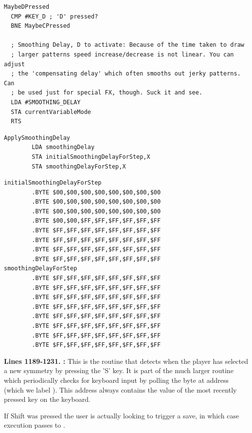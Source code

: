 \begin{lstlisting}[caption=From \icode{CheckKeyboardInput}.]
MaybeDPressed   
  CMP #KEY_D ; 'D' pressed?
  BNE MaybeCPressed

  ; Smoothing Delay, D to activate: Because of the time taken to draw
  ; larger patterns speed increase/decrease is not linear. You can adjust
  ; the 'compensating delay' which often smooths out jerky patterns. Can
  ; be used just for special FX, though. Suck it and see.
  LDA #SMOOTHING_DELAY
  STA currentVariableMode
  RTS 
\end{lstlisting}
\begin{lstlisting}[caption=From \icode{MainInterruptHandler}.]
ApplySmoothingDelay    
        LDA smoothingDelay
        STA initialSmoothingDelayForStep,X
        STA smoothingDelayForStep,X
\end{lstlisting}

\begin{lstlisting}[caption=Definition of \icode{smoothingDelayForStep} and its counterpart \icode{initialSmoothingDelayForStep}..]
initialSmoothingDelayForStep
        .BYTE $00,$00,$00,$00,$00,$00,$00,$00
        .BYTE $00,$00,$00,$00,$00,$00,$00,$00
        .BYTE $00,$00,$00,$00,$00,$00,$00,$00
        .BYTE $00,$00,$FF,$FF,$FF,$FF,$FF,$FF
        .BYTE $FF,$FF,$FF,$FF,$FF,$FF,$FF,$FF
        .BYTE $FF,$FF,$FF,$FF,$FF,$FF,$FF,$FF
        .BYTE $FF,$FF,$FF,$FF,$FF,$FF,$FF,$FF
        .BYTE $FF,$FF,$FF,$FF,$FF,$FF,$FF,$FF
smoothingDelayForStep
        .BYTE $FF,$FF,$FF,$FF,$FF,$FF,$FF,$FF
        .BYTE $FF,$FF,$FF,$FF,$FF,$FF,$FF,$FF
        .BYTE $FF,$FF,$FF,$FF,$FF,$FF,$FF,$FF
        .BYTE $FF,$FF,$FF,$FF,$FF,$FF,$FF,$FF
        .BYTE $FF,$FF,$FF,$FF,$FF,$FF,$FF,$FF
        .BYTE $FF,$FF,$FF,$FF,$FF,$FF,$FF,$FF
        .BYTE $FF,$FF,$FF,$FF,$FF,$FF,$FF,$FF
        .BYTE $FF,$FF,$FF,$FF,$FF,$FF,$FF,$FF
\end{lstlisting}
\clearpage
\textbf{Lines 1189-1231. :} This is the routine that detects when the player has selected a new
symmetry by pressing the 'S' key. It is part of the much larger routine  which periodically checks
for keyboard input by polling the byte at address  (which we label ). This address always
contains the value of the most recently pressed key on the keyboard.

If Shift was pressed the user is actually looking to trigger a save, in which case execution passes to .
\clearpage



